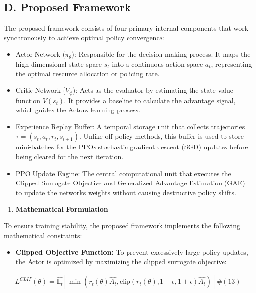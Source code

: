 \subsection{D. Proposed Framework}\label{d.-proposed-framework}

The proposed framework consists of four primary internal components that work synchronously to achieve optimal policy convergence:

\begin{itemize}
\item
  Actor Network (\(\pi_{\theta}\)): Responsible for the decision-making process. It maps the high-dimensional state space \(s_{t}\) into a continuous action space \(a_{t}\), representing the optimal resource allocation or policing rate.
\item
  Critic Network (\(V_{\phi}\)): Acts as the evaluator by estimating the state-value function \(V\left( s_{t} \right)\). It provides a baseline to calculate the advantage signal, which guides the Actor\textquotesingle s learning process.
\item
  Experience Replay Buffer: A temporal storage unit that collects trajectories \(\tau = \left( s_{t},a_{t},r_{t},s_{t + 1} \right)\). Unlike off-policy methods, this buffer is used to store mini-batches for the PPO\textquotesingle s stochastic gradient descent (SGD) updates before being cleared for the next iteration.
\item
  PPO Update Engine: The central computational unit that executes the Clipped Surrogate Objective and Generalized Advantage Estimation (GAE) to update the networks\textquotesingle{} weights without causing destructive policy shifts.
\end{itemize}

\begin{enumerate}
\def\labelenumi{\arabic{enumi})}
\item
  \textbf{Mathematical Formulation}
\end{enumerate}

To ensure training stability, the proposed framework implements the following mathematical constraints:

\begin{itemize}
\item
  \textbf{Clipped Objective Function:} To prevent excessively large policy updates, the Actor is optimized by maximizing the clipped surrogate objective:
\end{itemize}

\[\begin{array}{r}
L^{CLIP}(\theta) = \widehat{\mathbb{E}_{t}}\left\lbrack \min\left( r_{t}(\theta)\widehat{A_{t}},\text{clip}\left( r_{t}(\theta),1 - \epsilon,1 + \epsilon \right)\widehat{A_{t}} \right) \right\rbrack\#(13)
\end{array}\]

